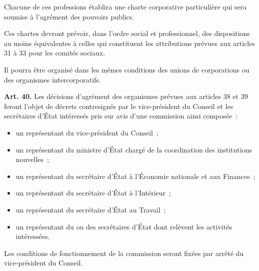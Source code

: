 \documentclass[french,twoside]{book} %
\newcommand{\labelchar}[1]{\textbf{\color{rubric} #1}}
\begin{document}
Chacune de ces professions établira une charte corporative particulière qui sera soumise à l’agrément des pouvoirs publics.\par
Ces chartes devront prévoir, dans l’ordre social et professionnel, des dispositions au moins équivalentes à celles qui constituent les attributions prévues aux articles 31 à 33 pour les comités sociaux.\par
Il pourra être organisé dans les mêmes conditions des unions de corporations ou des organismes intercorporatifs.\par
\bigbreak
\noindent \labelchar{Art. 40.} Les décisions d’agrément des organismes prévues aux articles 38 et 39 feront l’objet de décrets contresignés par le vice-président du Conseil et les secrétaires d’État intéressés pris sur avis d’une commission ainsi composée :\par

\begin{itemize}[itemsep=0pt,]
\item un représentant du vice-président du Conseil ;
\item un représentant du ministre d’État chargé de la coordination des institutions nouvelles ;
\item un représentant du secrétaire d’État à l’Économie nationale et aux Finances ;
\item un représentant du secrétaire d’État à l’Intérieur ;
\item un représentant du secrétaire d’État au Travail ;
\item un représentant du ou des secrétaires d’État dont relèvent les activités intéressées.
\end{itemize}

\noindent Les conditions de fonctionnement de la commission seront fixées par arrêté du vice-président du Conseil.
\end{document}

